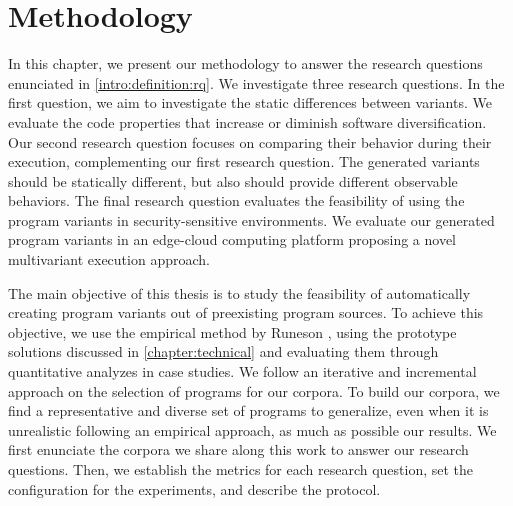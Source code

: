 \chapter{Methodology} 
\label{chapter:method}

\pagestyle{plain}
\renewcommand{\tool}{CROW\xspace}


In this chapter, we present our methodology to answer the research questions enunciated in \autoref{intro:definition:rq}.
We investigate three research questions. In the first question, we aim to investigate the static differences between variants. We evaluate the code properties that increase or diminish software diversification.
Our second research question focuses on comparing their behavior during their execution, complementing our first research question. The generated variants should be statically different, but also should provide different observable behaviors. 
The final research question evaluates the feasibility of using the program variants in security-sensitive environments. We evaluate our generated program variants in an edge-cloud computing platform proposing a novel multivariant execution approach.

The main objective of this thesis is to study the feasibility of automatically creating program variants out of preexisting program sources. To achieve this objective,
we use the empirical method by Runeson \etal \cite{Runeson2020}, using the prototype solutions discussed in \autoref{chapter:technical} and evaluating them through quantitative analyzes in case studies. We follow an iterative and incremental approach on the selection of programs for our corpora. To build our corpora, we find a representative and diverse set of programs to generalize, even when it is unrealistic following an empirical approach, as much as possible our results.
We first enunciate the corpora we share along this work to answer our research questions. Then, we establish the metrics for each research question, set the configuration for the experiments, and describe the protocol.

